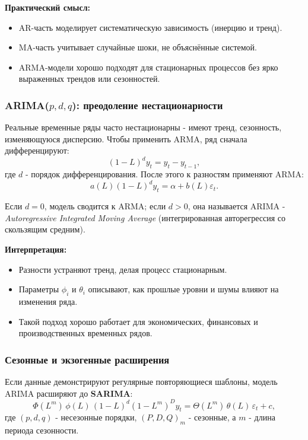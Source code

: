 \documentclass[12pt,a4paper]{article}
\begin{document}
\textbf{Практический смысл:}
\begin{itemize}
    \item AR-часть моделирует систематическую зависимость (инерцию и тренд).
    \item MA-часть учитывает случайные шоки, не объяснённые системой.
    \item ARMA-модели хорошо подходят для стационарных процессов без ярко выраженных трендов или сезонностей.
\end{itemize}

\subsubsection{ARIMA($p,d,q$): преодоление нестационарности}

Реальные временные ряды часто нестационарны - имеют тренд, сезонность, изменяющуюся дисперсию. Чтобы применить ARMA, ряд сначала дифференцируют:
\[
(1-L)^d y_t = y_t - y_{t-1},
\]
где $d$ - порядок дифференцирования. После этого к разностям применяют ARMA:
\[
a(L)(1-L)^d y_t = \alpha + b(L)\varepsilon_t.
\]

Если $d=0$, модель сводится к ARMA; если $d>0$, она называется ARIMA - \textit{Autoregressive Integrated Moving Average} (интегрированная авторегрессия со скользящим средним).

\textbf{Интерпретация:}
\begin{itemize}
    \item Разности устраняют тренд, делая процесс стационарным.
    \item Параметры $\phi_i$ и $\theta_i$ описывают, как прошлые уровни и шумы влияют на изменения ряда.
    \item Такой подход хорошо работает для экономических, финансовых и производственных временных рядов.
\end{itemize}

\subsubsection{Сезонные и экзогенные расширения}

Если данные демонстрируют регулярные повторяющиеся шаблоны, модель ARIMA расширяют до \textbf{SARIMA}:
\[
\Phi(L^m)\,\phi(L)\,(1-L)^d(1-L^m)^D y_t = \Theta(L^m)\,\theta(L)\,\varepsilon_t + c,
\]
где $(p,d,q)$ - несезонные порядки, $(P,D,Q)_m$ - сезонные, а $m$ - длина периода сезонности.
\end{document}
